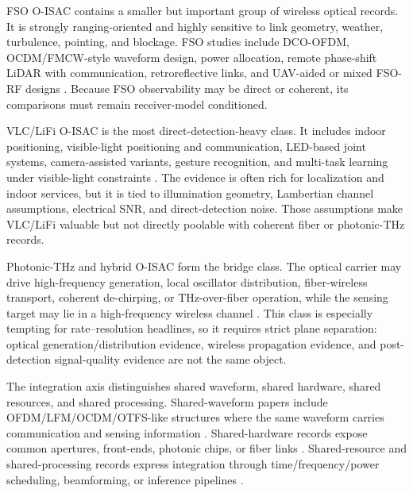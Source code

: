 \documentclass[letterpaper,journal]{IEEEtran}
\begin{document}
FSO O-ISAC contains a smaller but important group of wireless optical records. It is strongly ranging-oriented and highly sensitive to link geometry, weather, turbulence, pointing, and blockage. FSO studies include DCO-OFDM, OCDM/FMCW-style waveform design, power allocation, remote phase-shift LiDAR with communication, retroreflective links, and UAV-aided or mixed FSO-RF designs \cite{O_ISAC_005,O_ISAC_023,O_ISAC_035,O_ISAC_040,O_ISAC_048,O_ISAC_051,O_ISAC_055,O_ISAC_099,O_ISAC_106}. Because FSO observability may be direct or coherent, its comparisons must remain receiver-model conditioned.

VLC/LiFi O-ISAC is the most direct-detection-heavy class. It includes indoor positioning, visible-light positioning and communication, LED-based joint systems, camera-assisted variants, gesture recognition, and multi-task learning under visible-light constraints \cite{O_ISAC_009,O_ISAC_022,O_ISAC_030,O_ISAC_039,O_ISAC_050,O_ISAC_054,O_ISAC_062,O_ISAC_068,O_ISAC_092,O_ISAC_110,O_ISAC_303,O_ISAC_327}. The evidence is often rich for localization and indoor services, but it is tied to illumination geometry, Lambertian channel assumptions, electrical SNR, and direct-detection noise. Those assumptions make VLC/LiFi valuable but not directly poolable with coherent fiber or photonic-THz records.

Photonic-THz and hybrid O-ISAC form the bridge class. The optical carrier may drive high-frequency generation, local oscillator distribution, fiber-wireless transport, coherent de-chirping, or THz-over-fiber operation, while the sensing target may lie in a high-frequency wireless channel \cite{O_ISAC_002,O_ISAC_016,O_ISAC_026,O_ISAC_029,O_ISAC_043,O_ISAC_044,O_ISAC_047,O_ISAC_057,O_ISAC_065,O_ISAC_070,O_ISAC_077,O_ISAC_105}. This class is especially tempting for rate--resolution headlines, so it requires strict plane separation: optical generation/distribution evidence, wireless propagation evidence, and post-detection signal-quality evidence are not the same object.

The integration axis distinguishes shared waveform, shared hardware, shared resources, and shared processing. Shared-waveform papers include OFDM/LFM/OCDM/OTFS-like structures where the same waveform carries communication and sensing information \cite{O_ISAC_035,O_ISAC_060,O_ISAC_075,O_ISAC_117,O_ISAC_188,O_ISAC_219,O_ISAC_259,O_ISAC_272}. Shared-hardware records expose common apertures, front-ends, photonic chips, or fiber links \cite{O_ISAC_036,O_ISAC_045,O_ISAC_061,O_ISAC_164,O_ISAC_324,O_ISAC_354,O_ISAC_360}. Shared-resource and shared-processing records express integration through time/frequency/power scheduling, beamforming, or inference pipelines \cite{O_ISAC_049,O_ISAC_052,O_ISAC_083,O_ISAC_086,O_ISAC_102,O_ISAC_134,O_ISAC_138,O_ISAC_140,O_ISAC_242,O_ISAC_340}.
\end{document}

